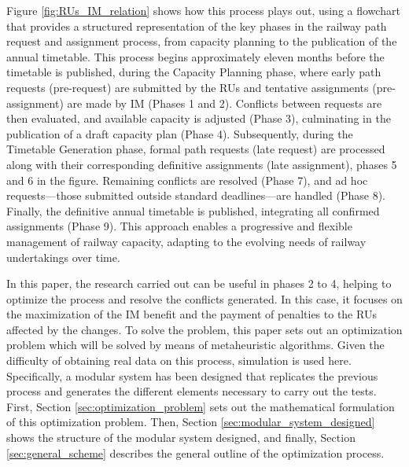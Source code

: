 \documentclass[Afour,sagev,times]{sagej}
\begin{document}
Figure \ref{fig:RUs_IM_relation} shows how this process plays out, using a flowchart that provides a structured representation of the key phases in the railway path request and assignment process, from capacity planning to the publication of the annual timetable. This process begins approximately eleven months before the timetable is published, during the Capacity Planning phase, where early path requests (pre-request) are submitted by the RUs and tentative assignments (pre-assignment) are made by \gls{IM} (Phases 1 and 2). Conflicts between requests are then evaluated, and available capacity is adjusted (Phase 3), culminating in the publication of a draft capacity plan (Phase 4). Subsequently, during the Timetable Generation phase, formal path requests (late request) are processed along with their corresponding definitive assignments (late assignment), phases 5 and 6 in the figure. Remaining conflicts are resolved (Phase 7), and ad hoc requests—those submitted outside standard deadlines—are handled (Phase 8). Finally, the definitive annual timetable is published, integrating all confirmed assignments (Phase 9). This approach enables a progressive and flexible management of railway capacity, adapting to the evolving needs of railway undertakings over time.


In this paper, the research carried out can be useful in phases 2 to 4, helping to optimize the process and resolve the conflicts generated. In this case, it focuses on the maximization of the \gls{IM} benefit and the payment of penalties to the \glspl{RU} affected by the changes. To solve the problem, this paper sets out an optimization problem which will be solved by means of metaheuristic algorithms. Given the difficulty of obtaining real data on this process, simulation is used here. Specifically, a modular system has been designed that replicates the previous process and generates the different elements necessary to carry out the tests. First, Section \ref{sec:optimization_problem} sets out the mathematical formulation of this optimization problem. Then, Section \ref{sec:modular_system_designed} shows the structure of the modular system designed, and finally, Section \ref{sec:general_scheme} describes the general outline of the optimization process.  
\end{document}
